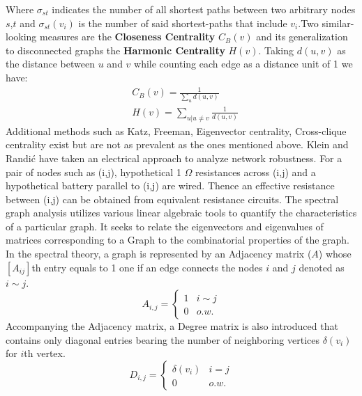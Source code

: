 \documentclass{article}
\begin{document}
	Where $\sigma_{st}$ indicates the number of all shortest paths between two arbitrary nodes $s$,$t$ and $\sigma_{st}(v_i)$ is the number of said shortest-paths that include $v_i$.\newline Two similar-looking measures are the \textbf{Closeness Centrality} $C_B(v)$ and its generalization to disconnected graphs the \textbf{Harmonic Centrality}\cite{marchiori2000harmony}\cite{rochat2009closeness} $H(v)$. Taking $d(u,v)$ as the distance between $u$ and $v$ while counting each edge as a distance unit of 1 we have:
	\begin{equation*}
		\begin{aligned}
			&C_B(v)= \frac{1}{\sum_{u}d(u,v)} \\
			&H(v) = \sum_{u|u\neq v} \frac{1}{d(u,v)}
		\end{aligned}
	\end{equation*}
	Additional methods such as Katz, Freeman, Eigenvector centrality, Cross-clique centrality exist but are not as prevalent as the ones mentioned above.
	Klein and Randi\'{c} \cite{klein1993m} have taken an electrical approach to analyze network robustness. For a pair of nodes such as (i,j), hypothetical 1 $\Omega$ resistances across (i,j) and a hypothetical battery parallel to (i,j) are wired. Thence an effective resistance between (i,j) can be obtained from equivalent resistance circuits.
	The spectral graph analysis utilizes various linear algebraic tools to quantify the characteristics of a particular graph. It seeks to relate the eigenvectors and eigenvalues of matrices corresponding to a Graph to the combinatorial properties of the graph. In the spectral theory, a graph is represented by an Adjacency matrix ($A$) whose $[A_{ij}]$th entry equals to 1 one if an edge connects the nodes $i$ and $j$ denoted as $i\sim j$.
	\begin{equation*}
		A_{i,j} = \begin{cases}
			1	& i\sim j \\
			0	& o.w. 
		\end{cases}
	\end{equation*}
	Accompanying the Adjacency matrix, a Degree matrix is also introduced that contains only diagonal entries bearing the number of neighboring vertices $\delta(v_i)$ for $i$th vertex.
	\begin{equation*}
		D_{i,j} = \begin{cases}
			\delta(v_i) & i=j \\
			0 & o.w.
		\end{cases}
	\end{equation*}
\end{document}
